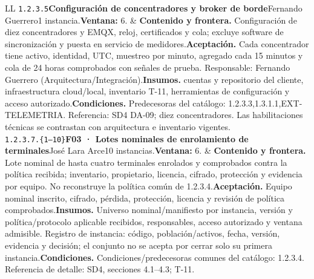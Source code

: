 \begin{longtable}{L{\tabcolsep\relax}L{\tabcolsep\relax}}
\texttt{1.\allowbreak{}2.\allowbreak{}3.\allowbreak{}5}\newline{}\textbf{Configuración de concentradores y broker de borde}\newline{}Fernando Guerrero\newline{}1 instancia.\newline{}\textbf{Ventana:} 6. & \textbf{Contenido y frontera.} Configuración de diez concentradores y EMQX, reloj, certificados y cola; excluye software de sincronización y puesta en servicio de medidores.\newline{}\textbf{Aceptación.} Cada concentrador tiene activo, identidad, UTC, muestreo por minuto, agregado cada 15 minutos y cola de 24 horas comprobados con señales de prueba. Responsable: Fernando Guerrero (Arquitectura/Integración).\newline{}\textbf{Insumos.} cuentas y repositorio del cliente, infraestructura cloud/local, inventario T-11, herramientas de configuración y acceso autorizado.\newline{}\textbf{Condiciones.} Predecesoras del catálogo: 1.2.3.3,1.3.1.1,EXT-TELEMETRIA. Referencia: SD4 DA-09; diez concentradores. Las habilitaciones técnicas se contrastan con arquitectura e inventario vigentes.\\\hline
\texttt{1.\allowbreak{}2.\allowbreak{}3.\allowbreak{}7.\allowbreak{}\{1--10\}}\newline{}\textbf{F03 · Lotes nominales de enrolamiento de terminales}\newline{}José Lara Arce\newline{}10 instancias.\newline{}\textbf{Ventana:} 6. & \textbf{Contenido y frontera.} Lote nominal de hasta cuatro terminales enrolados y comprobados contra la política recibida; inventario, propietario, licencia, cifrado, protección y evidencia por equipo. No reconstruye la política común de 1.2.3.4.\newline{}\textbf{Aceptación.} Equipo nominal inscrito, cifrado, pérdida, protección, licencia y revisión de política comprobados.\newline{}\textbf{Insumos.} Universo nominal/manifiesto por instancia, versión y política/protocolo aplicable recibidos, responsables, acceso autorizado y ventana admisible. Registro de instancia: código, población/activos, fecha, versión, evidencia y decisión; el conjunto no se acepta por cerrar solo su primera instancia.\newline{}\textbf{Condiciones.} Condiciones/predecesoras comunes del catálogo: 1.2.3.4. Referencia de detalle: SD4, secciones 4.1--4.3; T-11.\\\hline

\end{longtable}

